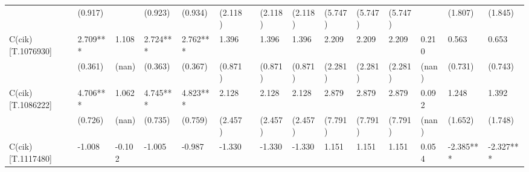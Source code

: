 \begin{table}
\begin{center}
\begin{tabular}{lllllllllllllll}
                  & (0.917)            &                    & (0.923)                & (0.934)             & (2.118)              &                      & (2.118)                  & (2.118)               & (5.747)              & (5.747)                  & (5.747)               &                               & (1.807)                                   & (1.845)                                 \\
C(cik)[T.1076930] & 2.709***           & 1.108              & 2.724***               & 2.762***            & 1.396                &                      & 1.396                    & 1.396                 & 2.209                & 2.209                    & 2.209                 & 0.210                         & 0.563                                     & 0.653                                   \\
                  & (0.361)            & (nan)              & (0.363)                & (0.367)             & (0.871)              &                      & (0.871)                  & (0.871)               & (2.281)              & (2.281)                  & (2.281)               & (nan)                         & (0.731)                                   & (0.743)                                 \\
C(cik)[T.1086222] & 4.706***           & 1.062              & 4.745***               & 4.823***            & 2.128                &                      & 2.128                    & 2.128                 & 2.879                & 2.879                    & 2.879                 & 0.092                         & 1.248                                     & 1.392                                   \\
                  & (0.726)            & (nan)              & (0.735)                & (0.759)             & (2.457)              &                      & (2.457)                  & (2.457)               & (7.791)              & (7.791)                  & (7.791)               & (nan)                         & (1.652)                                   & (1.748)                                 \\
C(cik)[T.1117480] & -1.008             & -0.102             & -1.005                 & -0.987              & -1.330               &                      & -1.330                   & -1.330                & 1.151                & 1.151                    & 1.151                 & 0.054                         & -2.385***                                 & -2.327***                               \\

\end{tabular}
\end{center}
\end{table}
